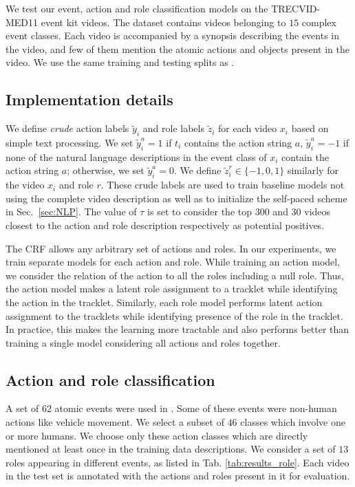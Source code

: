 \documentclass[10pt,twocolumn,letterpaper]{article}
\begin{document}
We test our event, action and role classification models on the TRECVID-MED11 event kit videos. The dataset contains videos belonging to $15$ complex event classes. Each video is accompanied by a synopsis describing the events in the video, and few of them mention the atomic actions and objects present in the video. We use the same training and testing splits as \cite{Izadinia_ECCV12}. 

\subsection{Implementation details}\label{sec:implementation_details}
We define \textit{crude} action labels $\tilde{y}_i$ and role labels
$\tilde{z}_i$ for each video $x_i$ based on simple text processing. We set
$\tilde{y}_i^a = 1$ if $t_i$ contains the action string $a$, $\tilde{y}_i^a =
-1$ if none of the natural language descriptions in the event class of $x_i$ contain
the action string $a$; otherwise, we set $\tilde{y}_i^a=0$. We define
$\tilde{z}_i^r \in \{-1,0,1\}$ similarly for the video $x_i$ and role $r$.
These crude labels are used to train baseline models not using the
complete video description as well as to initialize the self-paced scheme in
Sec.~\ref{sec:NLP}. The value of $\tau$ is set to consider the top $300$ and
$30$ videos closest to the action and role description respectively as
potential positives.

The CRF allows any arbitrary set of actions and roles. In our experiments, we train separate models for each action and role. While training an action model, we consider the relation of the action to all the roles including a null role. Thus, the action model makes a latent role assignment to a tracklet while identifying the action in the tracklet. Similarly, each role model performs latent action assignment to the tracklets while identifying presence of the role in the tracklet. In practice, this makes the learning more tractable and also performs better than training a single model considering all actions and roles together.

\subsection{Action and role classification} \label{sec:results_actionRoles}
A set of $62$ atomic events were used in \cite{Izadinia_ECCV12}. Some of these events were non-human actions like vehicle movement. We select a subset of $46$ classes which involve one or more humans. We choose only these action classes which are directly mentioned at least once in the training data descriptions. We consider a set of $13$ roles appearing in different events, as listed in Tab. \ref{tab:results_role}. Each video in the test set is annotated with the actions and roles present in it for evaluation. 
  
\end{document}
